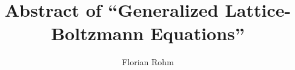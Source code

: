 \documentclass[]{article}
\title{Abstract of ``Generalized Lattice-Boltzmann Equations''}
\author{Florian Rohm}
\begin{document}
\maketitle

\begin{abstract}

\end{abstract}

\section{}
\end{document}
